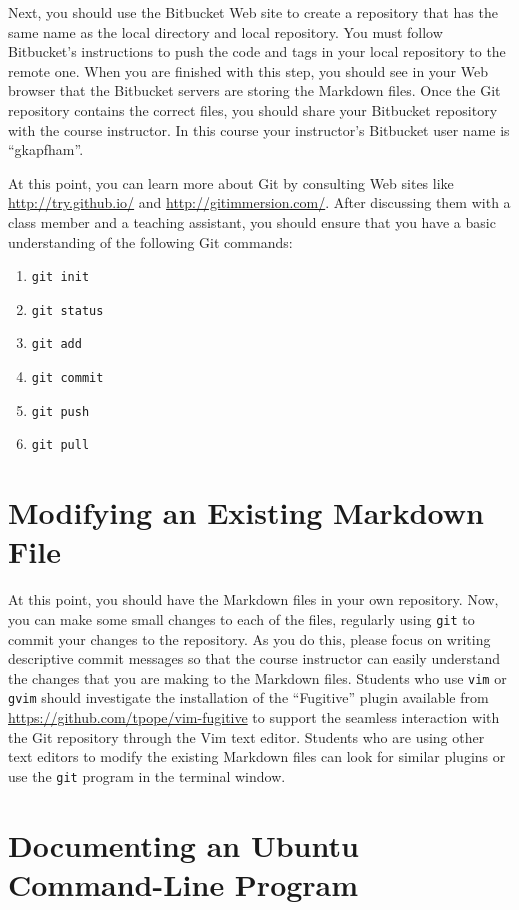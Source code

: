Next, you should use the Bitbucket Web site to create a repository that has the same name as the local directory and
local repository.  You must follow Bitbucket's instructions to push the code and tags in your local repository to the
remote one. When you are finished with this step, you should see in your Web browser that the Bitbucket servers are
storing the Markdown files. Once the Git repository contains the correct files, you should share your Bitbucket repository
with the course instructor. In this course your instructor's Bitbucket user name is ``gkapfham''.

At this point, you can learn more about Git by consulting Web sites like \url{http://try.github.io/} and
\url{http://gitimmersion.com/}.  After discussing them with a class member and a teaching assistant, you should ensure
that you have a basic understanding of the following Git commands:

\vspace*{-.125in}
\begin{enumerate}
  \setlength{\itemsep}{-.03in}
  \item {\tt git init}
  \item {\tt git status}
  \item {\tt git add}
  \item {\tt git commit}
  \item {\tt git push}
  \item {\tt git pull}
\end{enumerate}
\vspace*{-.15in}

\section*{Modifying an Existing Markdown File}

At this point, you should have the Markdown files in your own repository. Now, you can make some small changes to each
of the files, regularly using {\tt git} to commit your changes to the repository. As you do this, please focus on
writing descriptive commit messages so that the course instructor can easily understand the changes that you are making
to the Markdown files. Students who use {\tt vim} or {\tt gvim} should investigate the installation of the ``Fugitive''
plugin available from \url{https://github.com/tpope/vim-fugitive} to support the seamless interaction with the Git
repository through the Vim text editor. Students who are using other text editors to modify the existing Markdown files
can look for similar plugins or use the {\tt git} program in the terminal window.

\section*{Documenting an Ubuntu Command-Line Program}



